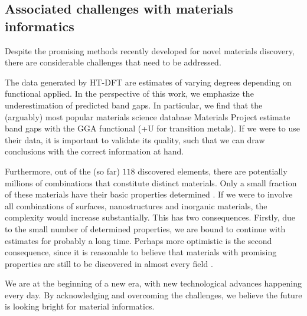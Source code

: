 \subsection{Associated challenges with materials informatics}


Despite the promising methods recently developed for novel materials discovery, there are considerable challenges that need to be addressed.

The data generated by HT-DFT are estimates of varying degrees depending on functional applied. In the perspective of this work, we emphasize the underestimation of predicted band gaps. In particular, we find that the (arguably) most popular materials science database Materials Project estimate band gaps with the GGA functional (+U for transition metals). If we were to use their data, it is important to validate its quality, such that we can draw conclusions with the correct information at hand.

Furthermore, out of the (so far) $118$ discovered elements, there are potentially millions of combinations that constitute distinct materials. Only a small fraction of these materials have their basic properties determined \cite{Springer2017}. If we were to involve all combinations of surfaces, nanostructures and inorganic materials, the complexity would increase substantially. This has two consequences. Firstly, due to the small number of determined properties, we are bound to continue with estimates for probably a long time. Perhaps more optimistic is the second consequence, since it is reasonable to believe that materials with promising properties are still to be discovered in almost every field \cite{Pedregosa2012}.

We are at the beginning of a new era, with new technological advances happening every day. By acknowledging and overcoming the challenges, we believe the future is looking bright for material informatics.
